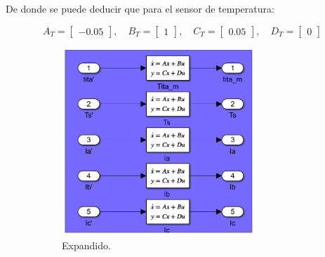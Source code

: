 \documentclass{article}
\begin{document}
De donde se puede deducir que para el sensor de temperatura:

\[
A_T = \begin{bmatrix}
-0.05
\end{bmatrix}, \quad
B_T = \begin{bmatrix}
1
\end{bmatrix}, \quad
C_T = \begin{bmatrix}
0.05
\end{bmatrix}, \quad
D_T = \begin{bmatrix}
0
\end{bmatrix}
\]

\begin{figure}[H]
    \begin{subfigure}[b]{0.75\textwidth}
        \centering
        \includegraphics[width=0.8\textwidth]{sensores_no_ideales.png}
        \caption{Expandido.}
    \end{subfigure}
    \begin{subfigure}[b]{0.24\textwidth}
        \centering

\end{subfigure}
\end{figure}
\end{document}
